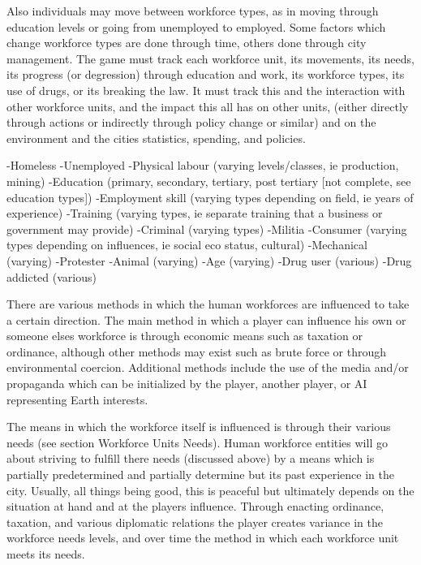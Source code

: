 Also individuals may move between workforce types, as in moving through education levels or going from unemployed to employed. Some factors which change workforce types are done through time, others done through city management. The game must track each workforce unit, its movements, its needs, its progress (or degression) through education and work, its workforce types, its use of drugs, or its breaking the law. It must track this and the interaction with other workforce units, and the impact this all has on other units, (either directly through actions or indirectly through policy change or similar) and on the environment and the cities statistics, spending, and policies.


-Homeless
-Unemployed
-Physical labour (varying levels/classes, ie production, mining)
-Education (primary, secondary, tertiary, post tertiary [not complete, see education types])
-Employment skill (varying types depending on field, ie years of experience)
-Training (varying types, ie separate training that a business or government may provide)
-Criminal (varying types)
-Militia
-Consumer (varying types depending on influences, ie social eco status, cultural)
-Mechanical (varying) 
-Protester
-Animal (varying)
-Age (varying)
-Drug user (various)
-Drug addicted (various)








There are various methods in which the human workforces are influenced to take a certain direction. The main method in which a player can influence his own or someone elses workforce is through economic means such as taxation or ordinance, although other methods may exist such as brute force or through environmental coercion. Additional methods include the use of the media and/or propaganda which can be initialized by the player, another player, or AI representing Earth interests.

The means in which the workforce itself is influenced is through their various needs (see section Workforce Units Needs). Human workforce entities will go about striving to fulfill there needs (discussed above) by a means which is partially predetermined and partially determine but its past experience in the city. Usually, all things being good, this is peaceful but ultimately depends on the situation at hand and at the players influence. Through enacting ordinance, taxation, and various diplomatic relations the player creates variance in the workforce needs levels, and over time the method in which each workforce unit meets its needs.

